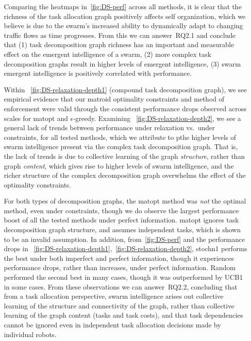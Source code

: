 {Comparing the heatmaps in~\cref{fig:DS-perf} across all methods, it is clear that
the richness of the task allocation graph positively affects self organization, which
we believe is due to the swarm's increased ability to dynamically adapt to changing
traffic flows as time progresses. From this we can answer~\gls{RQ2.1} and
conclude that (1) task decomposition graph richness has an important and measurable
effect on the emergent intelligence of a swarm, (2) more complex task decomposition
graphs result in higher levels of emergent intelligence, (3) swarm emergent
intelligence is positively correlated with performance.

Within ~\cref{fig:DS-relaxation-depth1} (compound task decomposition graph), we
see empirical evidence that our matroid optimality constraints and method of
enforcement were valid through the consistent performance drops observed across
scales for \gls{matopt} and $\epsilon$-greedy. Examining
~\cref{fig:DS-relaxation-depth2}, we see a general lack of trends between
performance under relaxation vs.~under constraints, for all tested methods,
which we attribute to pthe higher levels of swarm intelligence present via the
complex task decomposition graph. That is, the lack of trends is due to
collective learning of the graph \emph{structure}, rather than graph
\emph{content}, which gives rise to higher levels of swarm intelligence, and the
richer structure of the complex decomposition graph overwhelms the effect of the
optimality constraints.

For both types of decomposition graphs, the \gls{matopt} method was \emph{not}
the optimal method, even under constraints, though we do observe the largest
performance boost of all the tested methods under perfect
information. \gls{matopt} ignores task decomposition graph structure, and
assumes independent tasks, which is shown to be an invalid assumption. In
addition, from~\cref{fig:DS-perf} and the performance drops in
~\cref{fig:DS-relaxation-depth1},~\cref{fig:DS-relaxation-depth2},
\gls{stochn1} performs the best under both imperfect and perfect information,
though it experiences performance drops, rather than increases, under perfect
information. Random performed the second best in many cases, though it was
outperformed by UCB1 in some cases. From these observations we can
answer~\gls{RQ2.2}, concluding that from a task allocation perspective, swarm
intelligence arises out collective learning of the structure and connectivity of
the graph, rather than collective learning of the graph content (tasks and task
costs), and that task dependencies cannot be ignored even in independent task
allocation decisions made by individual robots.

}
